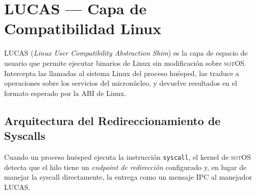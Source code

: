 \documentclass[11pt,twoside,openright]{book}
\theoremstyle{definition}
\theoremstyle{plain}
\theoremstyle{remark}
\newcommand{\sotos}{\textsc{sotOS}}
\begin{document}
\chapter{LUCAS --- Capa de Compatibilidad Linux}
\label{chap:lucas}

LUCAS (\emph{Linux User Compatibility Abstraction Shim}) es la capa de
espacio de usuario que permite ejecutar binarios de Linux sin modificación sobre
\sotos{}. Intercepta las llamadas al sistema Linux del proceso huésped, las traduce
a operaciones sobre los servicios del micronúcleo, y devuelve resultados en el
formato esperado por la ABI de Linux.

\section{Arquitectura del Redireccionamiento de Syscalls}
\label{sec:lucas-arch}

Cuando un proceso huésped ejecuta la instrucción \texttt{syscall}, el kernel de
\sotos{} detecta que el hilo tiene un \emph{endpoint de redirección} configurado
y, en lugar de manejar la syscall directamente, la entrega como un mensaje IPC
al manejador LUCAS.
\end{document}

